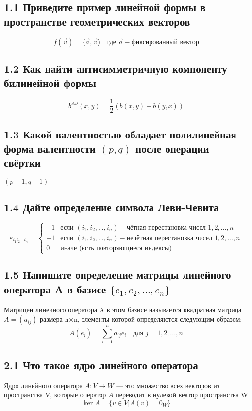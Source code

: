 \documentclass{article}
\begin{document}
\subsection*{1.1 Приведите пример линейной формы в пространстве геометрических векторов}
\[f(\vec{v}) = \langle \vec{a}, \vec{v} \rangle \quad \text{где } \vec{a} - \text{фиксированный вектор}\]

\subsection*{1.2 Как найти антисимметричную компоненту билинейной формы}
\[b^{AS}(x, y) = \frac{1}{2} (b(x, y) - b(y, x))\]

\subsection*{1.3 Какой валентностью обладает полилинейная форма валентности \((p, q)\) после операции свёртки}
\((p-1, q-1)\)

\subsection*{1.4 Дайте определение символа Леви-Чевита}
\[\varepsilon_{i_1 i_2 ... i_n} =
\begin{cases}
+1 & \text{если } (i_1, i_2, ..., i_n) - \text{чётная перестановка чисел } 1,2,...,n \\
-1 & \text{если } (i_1, i_2, ..., i_n) - \text{нечётная перестановка чисел } 1,2,...,n \\
0 & \text{иначе (есть повторяющиеся индексы)}
\end{cases}\]

\subsection*{1.5 Напишите определение матрицы линейного оператора A в базисе \(\{e_1, e_2, ..., e_n\}\)}
Матрицей линейного оператора A в этом базисе называется квадратная матрица \(A=(a_{ij})\) размера n×n, элементы которой определяются следующим образом:
\[A(e_j) = \sum_{i=1}^n a_{ij} e_i \quad \text{для } j = 1, 2, ..., n\]

\subsection*{2.1 Что такое ядро линейного оператора}
Ядро линейного оператора \(A: V \to W\) — это множество всех векторов из пространства V, которые оператор \(A\) переводит в нулевой вектор пространства W
\[\ker A = \{v \in V | A(v) = 0_W\}\]
\end{document}
